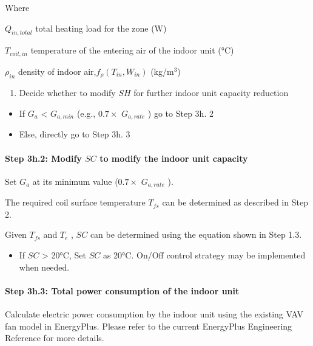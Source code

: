 Where

\(Q_{in,total}\) total heating load for the zone (W)

\(T_{coil,in}\) temperature of the entering air of the indoor unit (°C)

\(\rho_{in}\) density of indoor air,\(f_{\rho}(T_{in},W_{in})\) (kg/m\(^{3}\))

\begin{enumerate}
\def\labelenumi{\arabic{enumi})}
\setcounter{enumi}{2}
\tightlist
\item
  Decide whether to modify \(SH\) for further indoor unit capacity reduction
\end{enumerate}

\begin{itemize}
\item
  If \(G_a\) \textless{} \(G_{a,min}\) (e.g., \(0.7\times\) \(G_{a,rate}\) ) go to Step 3h. 2
\item
  Else, directly go to Step 3h. 3
\end{itemize}

\paragraph{\texorpdfstring{Step 3h.2: Modify \(SC\) to modify the indoor unit capacity}{Step 3h.2: Modify SC to modify the indoor unit capacity}}\label{step-3h.2-modify-sc-to-modify-the-indoor-unit-capacity}

Set \(G_a\) at its minimum value (\(0.7\times\) \(G_{a,rate}\) ).

The required coil surface temperature \(T_{fs}\) can be determined as described in Step 2.

Given \(T_{fs}\) and \(T_e\) , \(SC\) can be determined using the equation shown in Step 1.3.

\begin{itemize}
\tightlist
\item
  If \(SC\) \textgreater{} 20°C, Set \(SC\) as 20°C. On/Off control strategy may be implemented when needed.
\end{itemize}

\paragraph{Step 3h.3: Total power consumption of the indoor unit}\label{step-3h.3-total-power-consumption-of-the-indoor-unit}

Calculate electric power consumption by the indoor unit using the existing VAV fan model in EnergyPlus. Please refer to the current EnergyPlus Engineering Reference for more details.

